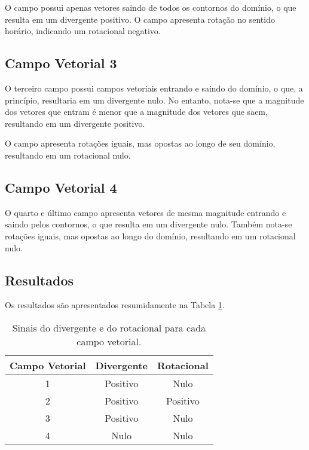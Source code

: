O campo possui apenas vetores saindo  de todos os contornos do dom\'inio, o que resulta em um divergente positivo. O campo apresenta rota\c{c}\~ao no sentido hor\'ario, indicando um rotacional negativo.

\subsection{Campo Vetorial 3} \label{sec:campo3}
O terceiro campo possui campos vetoriais entrando e saindo do dom\'inio, o que, a princ\'ipio, resultaria em um divergente nulo. No entanto, nota-se que a magnitude dos vetores que entram \'e menor que a magnitude dos vetores que saem, resultando em um divergente positivo. 

O campo apresenta rota\c{c}\~oes iguais, mas opostas ao longo de seu dom\'inio, resultando em um rotacional nulo.

\subsection{Campo Vetorial 4} \label{sec:campo4}
O quarto e \'ultimo campo apresenta vetores de mesma magnitude entrando e saindo pelos contornos, o que resulta em um divergente nulo. Tamb\'em nota-se rota\c{c}\~oes iguais, mas opostas ao longo do dom\'inio, resultando em um rotacional nulo.

\subsection{Resultados} \label{sec:res5}
Os resultados s\~ao apresentados resumidamente na Tabela \ref{tab:divrot}.
\begin{table}[h]
    \centering
    \caption{Sinais do divergente e do rotacional para cada campo vetorial.}
    \vskip 0.2cm
    \begin{tabular}{ccc}
        \hline
        \textbf{Campo Vetorial} & \textbf{Divergente} & \textbf{Rotacional} \\
        \hline
        1 & Positivo & Nulo \\
        2 & Positivo & Positivo \\
        3 & Positivo & Nulo \\
        4 & Nulo & Nulo \\
        \hline
    \end{tabular}
    \label{tab:divrot}
\end{table}